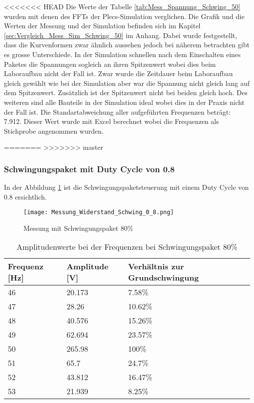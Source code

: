 <<<<<<< HEAD
Die Werte der Tabelle \ref{tab:Mess_Spannung_Schwing_50} wurden mit denen des FFTs der Plecs-Simulation verglichen. Die Grafik und die Werten der Messung und der Simulation befinden sich im Kapitel \ref{sec:Vergleich_Mess_Sim_Schwing_50} im Anhang. Dabei wurde festgestellt, dass die Kurvenformen zwar ähnlich aussehen jedoch bei näherem betrachten gibt es grosse Unterschiede. In der Simulation schnellen nach dem Einschalten eines Paketes die Spannungen sogleich an ihren Spitzenwert wobei dies beim Laboraufbau nicht der Fall ist. 
Zwar wurde die Zeitdauer beim Laboraufbau gleich gewählt wie bei der Simulation aber war die Spannung nicht gleich lang auf dem Spitzenwert. Zusätzlich ist der Spitzenwert nicht bei beiden gleich hoch. Des weiteren sind alle Bauteile in der Simulation ideal wobei dies in der Praxis nicht der Fall ist. Die Standartabweichung aller aufgeführten Frequenzen beträgt: 7.912. Dieser Wert wurde mit Excel berechnet wobei die Frequenzen als Stichprobe angenommen wurden.

=======
>>>>>>> master
\newpage
\subsubsection*{Schwingungspaket mit Duty Cycle von 0.8}
In der Abbildung \ref{fig:Mess_Schwing_80} ist die Schwingungspaketsteuerung mit einem Duty Cycle von 0.8 ersichtlich.
\begin{figure}[ht!]
	\centering
	\texttt{[image: Messung\_Widerstand\_Schwing\_0\_8.png]}	
	\caption{Messung mit Schwingungspaket 80\%}\label{fig:Mess_Schwing_80}
\end{figure}


\begin{table}[ht!]
	\centering
	\begin{tabular}{|l|l|l|}
		\hline
		Frequenz {[}Hz{]} & Amplitude {[}V{]} & Verhältnis zur Grundschwingung \\ \hline
		46                & 20.173            & 7.58\%                         \\ \hline
		47                & 28.26             & 10.62\%                        \\ \hline
		48                & 40.576            & 15.26\%                        \\ \hline
		49                & 62.694            & 23.57\%                        \\ \hline
		50                & 265.98            & 100\%                          \\ \hline
		51                & 65.7              & 24.7\%                         \\ \hline
		52                & 43.812            & 16.47\%                        \\ \hline
		53                & 21.939            & 8.25\%                         \\ \hline
	\end{tabular}
\caption{Amplitudenwerte bei der Frequenzen bei Schwingungspaket 80\%}\label{tab:Mess_Spannung_Schwing_80}
\end{table}

